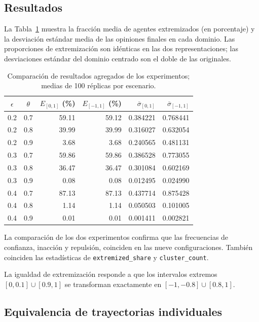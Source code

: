 \documentclass[11pt,a4paper]{article}
\begin{document}
\subsection{Resultados}
La Tabla~\ref{tab:resultados} muestra la fracción media de agentes extremizados (en porcentaje) y la desviación estándar media de las opiniones finales en cada dominio. Las proporciones de extremización son idénticas en las dos representaciones; las desviaciones estándar del dominio centrado son el doble de las originales.
\begin{table}[htbp]
\centering
\caption{Comparación de resultados agregados de los experimentos; medias de 100 réplicas por escenario.}
\label{tab:resultados}
\small
\begin{tabular}{ccrrrr}
\toprule
$\epsilon$ & $\theta$ & $E_{[0,1]}$ (\%) & $E_{[-1,1]}$ (\%) & $\overline{\sigma}_{[0,1]}$ & $\overline{\sigma}_{[-1,1]}$ \\
\midrule
0.2 & 0.7 & 59.11 & 59.12 & 0.384221 & 0.768441 \\
0.2 & 0.8 & 39.99 & 39.99 & 0.316027 & 0.632054 \\
0.2 & 0.9 & 3.68 & 3.68 & 0.240565 & 0.481131 \\
0.3 & 0.7 & 59.86 & 59.86 & 0.386528 & 0.773055 \\
0.3 & 0.8 & 36.47 & 36.47 & 0.301084 & 0.602169 \\
0.3 & 0.9 & 0.08 & 0.08 & 0.012495 & 0.024990 \\
0.4 & 0.7 & 87.13 & 87.13 & 0.437714 & 0.875428 \\
0.4 & 0.8 & 1.14 & 1.14 & 0.050503 & 0.101005 \\
0.4 & 0.9 & 0.01 & 0.01 & 0.001411 & 0.002821 \\
\bottomrule
\end{tabular}
\end{table}

La comparación de los dos experimentos confirma que las frecuencias de confianza, inacción y repulsión, coinciden en las nueve configuraciones. También coinciden las estadísticas de \texttt{extremized\_share} y \texttt{cluster\_count}. 

La igualdad de extremización responde a que los intervalos extremos $[0,0.1]\cup[0.9,1]$ se transforman exactamente en $[-1,-0.8]\cup[0.8,1]$.

\subsection{Equivalencia de trayectorias individuales}
\end{document}
